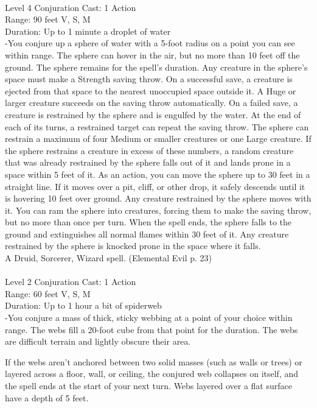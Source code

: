 \documentclass[10pt,twocolumn]{report}
\begin{document}
 \\
Level 4 \quad Conjuration \quad Cast: 1 Action\\
Range: 90 feet \quad V, S, M\\
Duration: Up to 1 minute \quad a droplet of water\\
-You conjure up a sphere of water with a 5-foot radius on a point you can see within range. The sphere can hover in the air, but no more than 10 feet off the ground. The sphere remains for the spell’s duration.
Any creature in the sphere’s space must make a Strength saving throw. On a successful save, a creature is ejected from that space to the nearest unoccupied space outside it. A Huge or larger creature succeeds on the saving throw automatically. On a failed save, a creature is restrained by the sphere and is engulfed by the water. At the end of each of its turns, a restrained target can repeat the saving throw.
The sphere can restrain a maximum of four Medium or smaller creatures or one Large creature. If the sphere restrains a creature in excess of these numbers, a random creature that was already restrained by the sphere falls out of it and lands prone in a space within 5 feet of it.
As an action, you can move the sphere up to 30 feet in a straight line. If it moves over a pit, cliff, or other drop, it safely descends until it is hovering 10 feet over ground. Any creature restrained by the sphere moves with it. You can ram the sphere into creatures, forcing them to make the saving throw, but no more than once per turn.
When the spell ends, the sphere falls to the ground and extinguishes all normal flames within 30 feet of it. Any creature restrained by the sphere is knocked prone in the space where it falls.\\
A Druid, Sorcerer, Wizard spell. (Elemental Evil p. 23) \\


 \\
Level 2 \quad Conjuration \quad Cast: 1 Action\\
Range: 60 feet \quad V, S, M\\
Duration: Up to 1 hour \quad a bit of spiderweb\\
-You conjure a mass of thick, sticky webbing at a point of your choice within range.
The webs fill a 20-foot cube from that point for the duration. The webs are difficult terrain and lightly obscure their area.

If the webs aren’t anchored between two solid masses (such as walls or trees) or layered across a floor, wall, or ceiling, the conjured web collapses on itself, and the spell ends at the start of your next turn. Webs layered over a flat surface have a depth of 5 feet.
\end{document}
